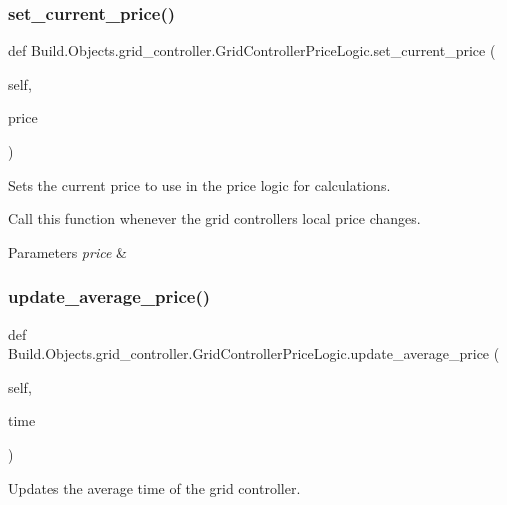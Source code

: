 \subsubsection{\texorpdfstring{set\+\_\+current\+\_\+price()}{set\_current\_price()}}
{\footnotesize\ttfamily def Build.\+Objects.\+grid\+\_\+controller.\+Grid\+Controller\+Price\+Logic.\+set\+\_\+current\+\_\+price (\begin{DoxyParamCaption}\item[{}]{self,  }\item[{}]{price }\end{DoxyParamCaption})}



Sets the current price to use in the price logic for calculations. 

Call this function whenever the grid controller\textquotesingle{}s local price changes. 
\begin{DoxyParams}{Parameters}
{\em price} & \\
\hline
\end{DoxyParams}
\mbox{\label{class_build_1_1_objects_1_1grid__controller_1_1_grid_controller_price_logic_a241ac9f19af131870e9bad6dd2b3cbc3}} 
\subsubsection{\texorpdfstring{update\+\_\+average\+\_\+price()}{update\_average\_price()}}
{\footnotesize\ttfamily def Build.\+Objects.\+grid\+\_\+controller.\+Grid\+Controller\+Price\+Logic.\+update\+\_\+average\+\_\+price (\begin{DoxyParamCaption}\item[{}]{self,  }\item[{}]{time }\end{DoxyParamCaption})}



Updates the average time of the grid controller. 


